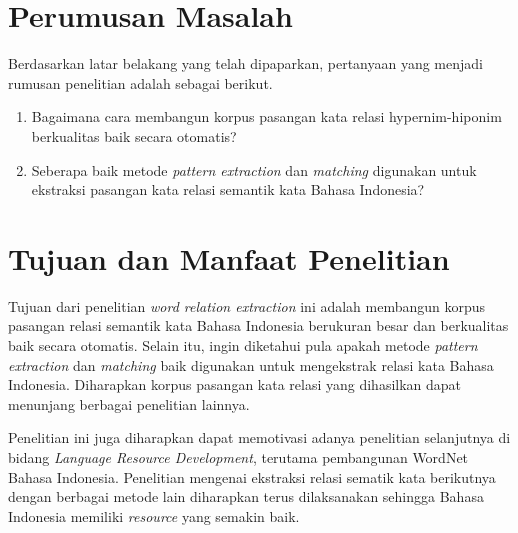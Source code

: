 \section{Perumusan Masalah}
Berdasarkan latar belakang yang telah dipaparkan, pertanyaan yang menjadi rumusan penelitian adalah sebagai berikut.
\begin{enumerate}
	\item Bagaimana cara membangun korpus pasangan kata relasi hypernim-hiponim berkualitas baik secara otomatis?
	\item Seberapa baik metode \textit{pattern extraction} dan \textit{matching} digunakan untuk ekstraksi pasangan kata relasi semantik kata Bahasa Indonesia?
\end{enumerate}

\section{Tujuan dan Manfaat Penelitian}
Tujuan dari penelitian \textit{word relation extraction} ini adalah membangun korpus pasangan relasi semantik kata Bahasa Indonesia berukuran besar dan berkualitas baik secara otomatis. Selain itu, ingin diketahui pula apakah metode \textit{pattern extraction} dan \textit{matching} baik digunakan untuk mengekstrak relasi kata Bahasa Indonesia. Diharapkan korpus pasangan kata relasi yang dihasilkan dapat menunjang berbagai penelitian lainnya.

Penelitian ini juga diharapkan dapat memotivasi adanya penelitian selanjutnya di bidang \textit{Language Resource Development}, terutama pembangunan WordNet Bahasa Indonesia. Penelitian mengenai ekstraksi relasi sematik kata berikutnya dengan berbagai metode lain diharapkan terus dilaksanakan sehingga Bahasa Indonesia memiliki \textit{resource} yang semakin baik.

